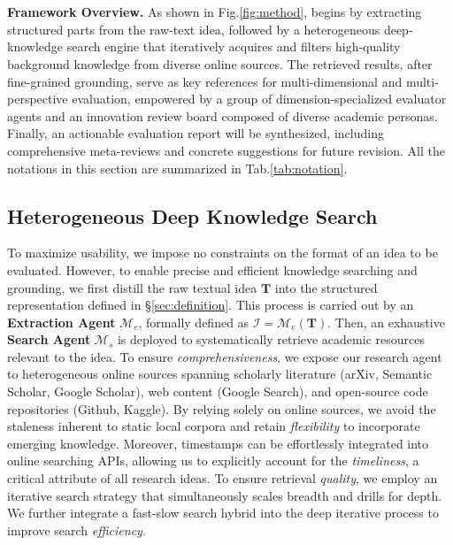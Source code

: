 \section{\ours}

\textbf{Framework Overview.}
As shown in Fig.\ref{fig:method}, {\ours} begins by extracting structured parts from the raw-text idea, followed by a heterogeneous deep-knowledge search engine that iteratively acquires and filters high-quality background knowledge from diverse online sources.
The retrieved results, after fine-grained grounding, serve as key references for multi-dimensional and multi-perspective evaluation, empowered by a group of dimension-specialized evaluator agents and an innovation review board composed of diverse academic personas.
Finally, an actionable evaluation report will be synthesized, including comprehensive meta-reviews and concrete suggestions for future revision.
All the notations in this section are summarized in Tab.\ref{tab:notation}.

\subsection{Heterogeneous Deep Knowledge Search}
\label{sec:search_engine}
To maximize usability, we impose no constraints on the format of an idea to be evaluated.
However, to enable precise and efficient knowledge searching and grounding, we first distill the raw textual idea $\boldsymbol{T}$ into the structured representation defined in \S\ref{sec:definition}.
This process is carried out by an \textbf{Extraction Agent} $\boldsymbol{\mathcal{M}}_e$, formally defined as $\boldsymbol{\mathcal{I}}=\boldsymbol{\mathcal{M}}_e(\boldsymbol{T})$.
Then, an exhaustive \textbf{Search Agent} $\boldsymbol{\mathcal{M}}_s$ is deployed to systematically retrieve academic resources relevant to the idea.
To ensure \textit{comprehensiveness}, we expose our research agent to heterogeneous online sources spanning scholarly literature (\arxiv arXiv, \semantic Semantic Scholar, \scholar Google Scholar), web content (\google Google Search), and open-source code repositories (\github Github, \kaggle Kaggle).
By relying solely on online sources, we avoid the staleness inherent to static local corpora and retain \textit{flexibility} to incorporate emerging knowledge.
Moreover, timestamps can be effortlessly integrated into online searching APIs, allowing us to explicitly account for the \textit{timeliness}, a critical attribute of all research ideas.
To ensure retrieval \textit{quality}, we employ an iterative search strategy that simultaneously scales breadth and drills for depth.
We further integrate a fast-slow search hybrid into the deep iterative process to improve search \textit{efficiency}.

